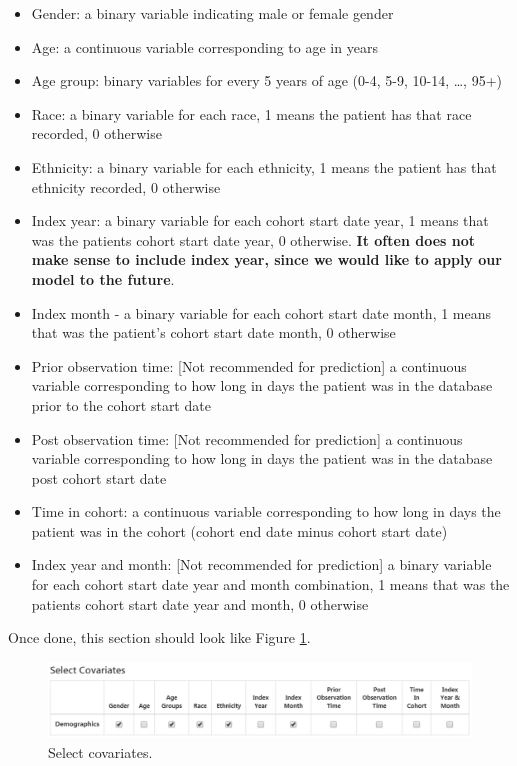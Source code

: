 \documentclass[11pt]{book}
\providecommand{\tightlist}{%
  \setlength{\itemsep}{0pt}\setlength{\parskip}{0pt}}
\theoremstyle{definition}
\theoremstyle{definition}
\theoremstyle{definition}
\theoremstyle{remark}
\begin{document}
\begin{itemize}
\tightlist
\item
  Gender: a binary variable indicating male or female gender
\item
  Age: a continuous variable corresponding to age in years
\item
  Age group: binary variables for every 5 years of age (0-4, 5-9, 10-14,
  \ldots{}, 95+)
\item
  Race: a binary variable for each race, 1 means the patient has that
  race recorded, 0 otherwise
\item
  Ethnicity: a binary variable for each ethnicity, 1 means the patient
  has that ethnicity recorded, 0 otherwise
\item
  Index year: a binary variable for each cohort start date year, 1 means
  that was the patients cohort start date year, 0 otherwise. \textbf{It
  often does not make sense to include index year, since we would like
  to apply our model to the future}.
\item
  Index month - a binary variable for each cohort start date month, 1
  means that was the patient's cohort start date month, 0 otherwise
\item
  Prior observation time: {[}Not recommended for prediction{]} a
  continuous variable corresponding to how long in days the patient was
  in the database prior to the cohort start date
\item
  Post observation time: {[}Not recommended for prediction{]} a
  continuous variable corresponding to how long in days the patient was
  in the database post cohort start date
\item
  Time in cohort: a continuous variable corresponding to how long in
  days the patient was in the cohort (cohort end date minus cohort start
  date)
\item
  Index year and month: {[}Not recommended for prediction{]} a binary
  variable for each cohort start date year and month combination, 1
  means that was the patients cohort start date year and month, 0
  otherwise
\end{itemize}

Once done, this section should look like Figure
\ref{fig:covariateSettings2}.

\begin{figure}

{\centering \includegraphics[width=1\linewidth]{images/PatientLevelPrediction/covariateSettings2} 

}

\caption{Select covariates.}\label{fig:covariateSettings2}
\end{figure}
\end{document}
